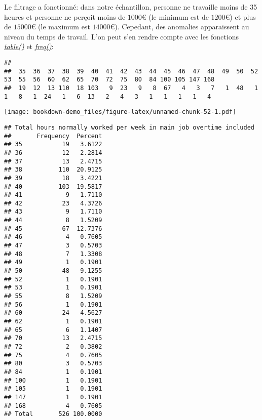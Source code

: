 \documentclass[
]{book}
\newenvironment{Shaded}{\begin{snugshade}}{\end{snugshade}}
\newcommand{\FunctionTok}[1]{\textcolor[rgb]{0.00,0.00,0.00}{#1}}
\newcommand{\NormalTok}[1]{#1}
\newcommand{\SpecialCharTok}[1]{\textcolor[rgb]{0.00,0.00,0.00}{#1}}
\begin{document}
Le filtrage a fonctionné: dans notre échantillon, personne ne travaille moins de 35 heures et personne ne perçoit moins de \(1000€\) (le minimum est de \(1200€\)) et plus de \(15000€\) (le maximum est \(14000€\)). Cepedant, des anomalies apparaissent au niveau du temps de travail. L'on peut s'en rendre compte avec les fonctions \href{https://www.rdocumentation.org/packages/base/versions/3.6.2/topics/table}{\emph{table()}} et \href{https://www.rdocumentation.org/packages/descr/versions/1.1.5/topics/freq}{\emph{freq()}}:

\begin{Shaded}
\end{Shaded}

\begin{verbatim}
## 
##  35  36  37  38  39  40  41  42  43  44  45  46  47  48  49  50  52  53  55  56  60  62  65  70  72  75  80  84 100 105 147 168 
##  19  12  13 110  18 103   9  23   9   8  67   4   3   7   1  48   1   1   8   1  24   1   6  13   2   4   3   1   1   1   1   4
\end{verbatim}

\begin{Shaded}
\end{Shaded}

\texttt{[image: bookdown-demo\_files/figure-latex/unnamed-chunk-52-1.pdf]}

\begin{verbatim}
## Total hours normally worked per week in main job overtime included 
##       Frequency  Percent
## 35           19   3.6122
## 36           12   2.2814
## 37           13   2.4715
## 38          110  20.9125
## 39           18   3.4221
## 40          103  19.5817
## 41            9   1.7110
## 42           23   4.3726
## 43            9   1.7110
## 44            8   1.5209
## 45           67  12.7376
## 46            4   0.7605
## 47            3   0.5703
## 48            7   1.3308
## 49            1   0.1901
## 50           48   9.1255
## 52            1   0.1901
## 53            1   0.1901
## 55            8   1.5209
## 56            1   0.1901
## 60           24   4.5627
## 62            1   0.1901
## 65            6   1.1407
## 70           13   2.4715
## 72            2   0.3802
## 75            4   0.7605
## 80            3   0.5703
## 84            1   0.1901
## 100           1   0.1901
## 105           1   0.1901
## 147           1   0.1901
## 168           4   0.7605
## Total       526 100.0000
\end{verbatim}
\end{document}
